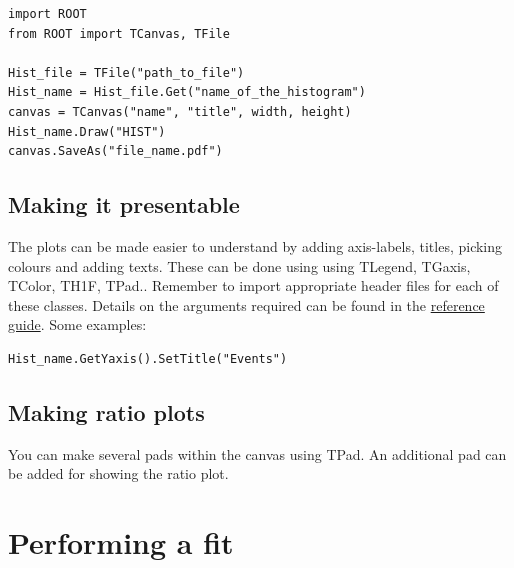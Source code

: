 \documentclass[letterpaper,12pt]{article}
\begin{document}
\begin{lstlisting}
import ROOT
from ROOT import TCanvas, TFile

Hist_file = TFile("path_to_file")
Hist_name = Hist_file.Get("name_of_the_histogram")
canvas = TCanvas("name", "title", width, height)
Hist_name.Draw("HIST")
canvas.SaveAs("file_name.pdf")

\end{lstlisting}

\subsection{Making it presentable}
The plots can be made easier to understand by adding axis-labels, titles, picking colours and adding texts. These can be done using  using TLegend, TGaxis, TColor, TH1F, TPad.. Remember to import appropriate header files for each of these classes. 
Details on the arguments required can be found in the \href{https://root.cern/doc/master/}{reference guide}. Some examples:

\begin{lstlisting}
Hist_name.GetYaxis().SetTitle("Events")
\end{lstlisting}

\subsection{Making ratio plots}
You can make several pads within the canvas using TPad. An additional pad can be added for showing the ratio plot.  

\section{Performing a fit}
% 
% 








\end{document}
